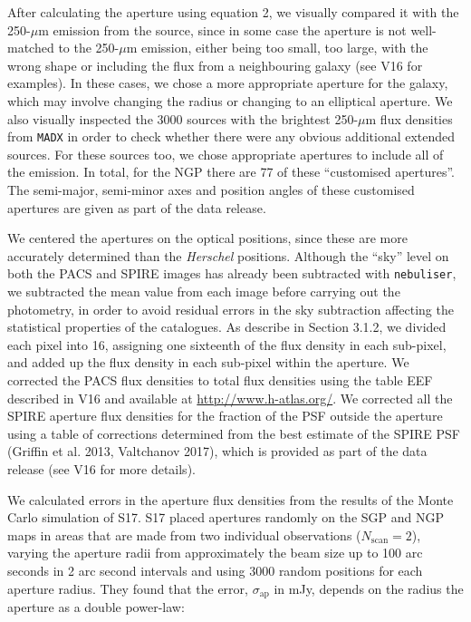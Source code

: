 \documentclass[a4paper,fleqn,usenatbib, twocolumn]{aastex61}
\begin{document}
After calculating the aperture using equation 2, we visually compared
it with the 250-$\mu$m emission from the source, since in some case
the aperture is not well-matched to the 250-$\mu$m emission, either
being too small, too large, with the wrong shape or including the flux
from a neighbouring galaxy (see V16 for examples).  In these cases, we
chose a more appropriate aperture for the galaxy, which may involve
changing the radius or changing to an elliptical aperture.  We also
visually inspected the 3000 sources with the brightest 250-$\mu$m flux
densities from {\tt MADX} in order to check whether there were any
obvious additional extended sources.  For these sources too, we chose
appropriate apertures to include all of the emission.  In total, for
the NGP there are 77 of these ``customised apertures''.  The
semi-major, semi-minor axes and position angles of these customised
apertures are given as part of the data release.

We centered the apertures on the optical positions, since these are
more accurately determined than the {\it Herschel} positions.  Although the
``sky'' level on both the PACS and SPIRE images has already been
subtracted with {\tt nebuliser}, 
we subtracted the mean value
from each image before carrying out the photometry, in order to
avoid residual errors in the sky subtraction affecting the
statistical properties of the catalogues.
As describe in Section 3.1.2, we divided each
pixel into 16, assigning one sixteenth of the flux density in each
sub-pixel, and added up the flux density in each sub-pixel within the
aperture.  We corrected the PACS flux densities to total flux
densities using the table EEF described in V16 and available at
\url{http://www.h-atlas.org/}.  We corrected all the SPIRE aperture
flux densities for the fraction of the PSF outside the aperture using
a table of corrections determined from the best estimate of the SPIRE
PSF (Griffin et al. 2013, Valtchanov 2017), which is provided as part
of the data release (see V16 for more details).


We calculated errors in the aperture flux densities from the results
of the Monte Carlo simulation of S17. S17 placed apertures randomly on
the SGP and NGP maps in areas that are made from two individual
observations ($N_{\mathrm{scan}}=2$), varying the aperture radii from
approximately the beam size up to 100 arc seconds in 2 arc second
intervals and using 3000 random positions for each aperture radius.
They found that the error, $\sigma_{\mathrm{ap}}$ in mJy, depends on
the radius the aperture as a double power-law:
\end{document}
